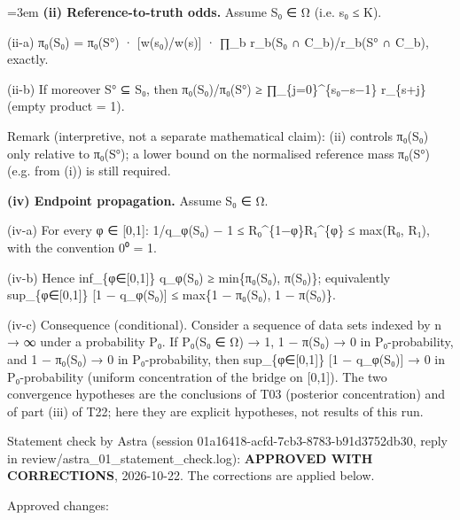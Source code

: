 \documentclass[11pt]{report}
\newenvironment{mdblock}{\begingroup\mdfont\raggedright\setlength{\parindent}{0pt}\setlength{\parskip}{0.55em}\emergencystretch=3em}{\par\endgroup}
\newcommand{\mdhead}[2]{\par\vspace{0.7em}\noindent{\bfseries\ifcase#1\or\large\or\normalsize\or\normalsize\or\small\or\small\or\small\fi #2}\par\nopagebreak\vspace{0.1em}}
\begin{document}
\begin{mdblock}
\textbf{(ii) Reference-to-truth odds.} Assume S₀ ∈ Ω (i.e. s₀ ≤ K).

\begin{mdbul}
\item (ii-a) π₀(S₀) = π₀(S°) · [w(s₀)/w(s)] · ∏\_b r\_b(S₀ ∩ C\_b)/r\_b(S° ∩ C\_b), exactly.
\item (ii-b) If moreover S° ⊆ S₀, then π₀(S₀)/π₀(S°) ≥ ∏\_\{j=0\}\textasciicircum{}\{s₀−s−1\} r\_\{s+j\} (empty product = 1).
\item Remark (interpretive, not a separate mathematical claim): (ii) controls π₀(S₀) only relative to π₀(S°); a lower bound on the normalised reference mass π₀(S°) (e.g. from (i)) is still required.
\end{mdbul}

\textbf{(iv) Endpoint propagation.} Assume S₀ ∈ Ω.

\begin{mdbul}
\item (iv-a) For every φ ∈ [0,1]: 1/q\_φ(S₀) − 1 ≤ R₀\textasciicircum{}\{1−φ\}R₁\textasciicircum{}\{φ\} ≤ max(R₀, R₁), with the convention 0⁰ = 1.
\item (iv-b) Hence inf\_\{φ∈[0,1]\} q\_φ(S₀) ≥ min\{π₀(S₀), π(S₀)\}; equivalently sup\_\{φ∈[0,1]\} [1 − q\_φ(S₀)] ≤ max\{1 − π₀(S₀), 1 − π(S₀)\}.
\item (iv-c) Consequence (conditional). Consider a sequence of data sets indexed by n → ∞ under a probability P₀. If P₀(S₀ ∈ Ω) → 1, 1 − π(S₀) → 0 in P₀-probability, and 1 − π₀(S₀) → 0 in P₀-probability, then sup\_\{φ∈[0,1]\} [1 − q\_φ(S₀)] → 0 in P₀-probability (uniform concentration of the bridge on [0,1]). The two convergence hypotheses are the conclusions of T03 (posterior concentration) and of part (iii) of T22; here they are explicit hypotheses, not results of this run.
\end{mdbul}

\mdhead{2}{Changes to the statement}

Statement check by Astra (session 01a16418-acfd-7cb3-8783-b91d3752db30, reply in review/astra\_01\_statement\_check.log): \textbf{APPROVED WITH CORRECTIONS}, 2026-10-22. The corrections are applied below.

Approved changes:


\end{mdblock}
\end{document}
